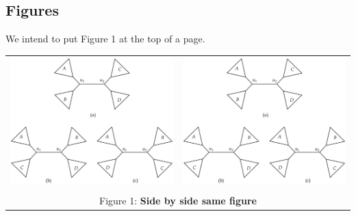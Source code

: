 \documentclass[16pt]{article}
\begin{document}
    \subsection{Figures}
        We intend to put Figure 1 at the top of a page.
        \newpage
        \begin{table}[t]
            \centering
            \begin{tabular}{cc}
            \includegraphics[scale=0.25, angle=90]{Images/Practice_Problem_1_Figure_page-0001.jpg}
            &         
            \includegraphics[scale=0.25, angle=90]{Images/Practice_Problem_1_Figure_page-0001.jpg}\\
            \multicolumn{2}{c}{}\\
            \multicolumn{2}{c}{Figure 1: \textbf{Side by side same figure}}
            \end{tabular}
            \label{tab:my_label1}
        \end{table}
\end{document}
